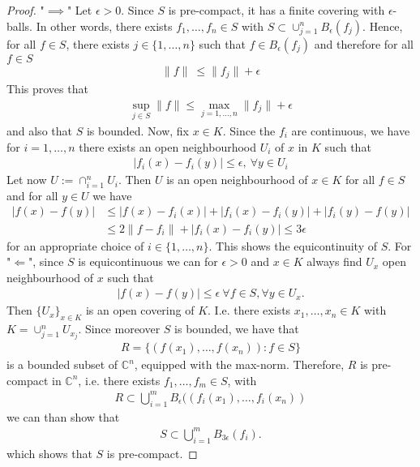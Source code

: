\documentclass[11pt,a4paper]{article}
\theoremstyle{definition}
\begin{document}
\begin{proof}
"$\implies$" Let $\epsilon >0$. Since $S$ is pre-compact, it has a finite covering with $\epsilon$-balls. In other words, there exists $f_1, \dots , f_n \in S$ with $S \subset \cup_{j=1}^n B_\epsilon(f_j)$. Hence, for all $f \in S$, there exists $j \in \lbrace 1, \dots , n \rbrace$ such that $f \in B_\epsilon ( f_j)$ and therefore for all $f \in S$ 
\begin{align*}
\| f\|\ \leq \| f_j\| + \epsilon
\end{align*}
This proves that 
\begin{align*}
\sup_{j \in S} \|f \| \leq \max_{j=1, \dots , n} \|f_j\| + \epsilon
\end{align*}
and also that $S$ is bounded. Now, fix $x \in K$. Since the $f_i$ are continuous, we have for $i=1, \dots , n$ there exists an open neighbourhood $U_i$ of $x$ in $K$ such that 
\begin{align*}
|f_i(x)-f_i(y)| \leq \epsilon, \ \forall y \in U_i
\end{align*}
Let now $U:= \cap_{i=1}^n U_i$. Then $U$ is an open neighbourhood of $x \in K$ for all $f \in S$ and for all $y \in U$ we have 
\begin{align*}
|f(x)-f(y)| & \leq |f(x)-f_i(x)| + |f_i(x)-f_i(y)| + |f_i(y)-f(y)|  \\
& \leq 2 \|f-f_i\| + |f_i(x)-f_i(y)| \leq 3 \epsilon
\end{align*}
for an appropriate choice of $i \in \lbrace 1, \dots , n\rbrace$. This shows the equicontinuity of $S$. 
\newpage
For "$\Longleftarrow$", since $S$ is equicontinuous we can for $\epsilon >0$ and $x \in K$ always find $U_x$ open neighbourhood of $x$ such that 
\begin{align*}
|f(x)-f(y)| \leq \epsilon \ \forall f \in S, \forall y \in U_x.
\end{align*}
Then $\lbrace U_x\rbrace_{x \in K}$ is an open covering of $K$. I.e. there exists $x_1, \dots , x_n \in K$ with $K = \cup_{j=1}^n U_{x_j}$. Since moreover $S$ is bounded, we have that 
\begin{align*}
R= \lbrace (f(x_1), \dots , f(x_n)) : f \in S \rbrace
\end{align*}
is a bounded subset of $\mathbb{C}^n$, equipped with the max-norm. Therefore, $R$ is pre-compact in $\mathbb{C}^n$, i.e. there exists $f_1, \dots , f_m \in S$, with 
\begin{align*}
R \subset \bigcup_{i=1}^m B_\epsilon ( (f_i(x_1), \dots , f_i(x_n))
\end{align*}
we can than show that 
\begin{align*}
S \subset \bigcup_{i=1}^m B_{ 3 \epsilon} (f_i).
\end{align*}
which shows that $S$ is pre-compact. 
\end{proof}
\end{document}
